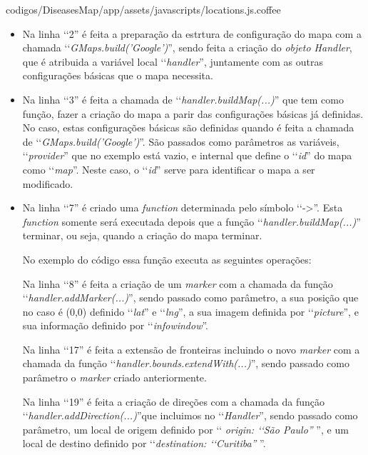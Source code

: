 
{codigos/DiseasesMap/app/assets/javascripts/locations.js.coffee}

\begin{itemize}

 \item Na linha ‘‘2'' é feita a preparação da estrtura de configuração do mapa com a chamada 
 ‘‘\emph{GMaps.build('Google')}'', sendo feita a criação do \emph{objeto Handler}, que é atribuida a 
 variável local ‘‘\emph{handler}'', juntamente com as outras configurações básicas que o mapa necessita.
 
 \item Na linha ‘‘3'' é feita a chamada de ‘‘\emph{handler.buildMap(...)}'' que tem como função, fazer a 
 criação do mapa a parir das configurações básicas já definidas. No caso, estas configurações básicas
 são definidas quando é feita a chamada de ‘‘\emph{GMaps.build('Google')}''. São passados como parâmetros
 as variáveis, ‘‘\emph{provider}'' que no exemplo está vazio, e internal que define o ‘‘\emph{id}'' do
 mapa como ‘‘\emph{map}''. Neste caso, o ‘‘\emph{id}'' serve para identificar o mapa a ser modificado.
 
 \item Na linha ‘‘7'' é criado uma \emph{function} determinada pelo símbolo ‘‘->''. Esta \emph{function}
 somente será executada depois que a função ‘‘\emph{handler.buildMap(...)}'' terminar, ou seja, quando a
 criação do mapa terminar.
 
 No exemplo do código essa função executa as seguintes operações:
 
  \subitem Na linha ‘‘8'' é feita a criação de um \emph{marker} com a chamada da função 
  ‘‘\emph{handler.addMarker(...)}'', sendo passado como parâmetro, a sua posição que no caso é (0,0) 
  definido ‘‘\emph{lat}'' e ‘‘\emph{lng}'', a sua imagem definida por ‘‘\emph{picture}'', e sua informação 
  definido por ‘‘\emph{infowindow}''.
 
  \subitem Na linha ‘‘17'' é feita a extensão de fronteiras incluindo o novo \emph{marker} com a chamada 
  da função ‘‘\emph{handler.bounds.extendWith(...)}'', sendo passado como parâmetro o \emph{marker} criado
  anteriormente.
 
  \subitem Na linha ‘‘19'' é feita a criação de direções com a chamada da função 
  ‘‘\emph{handler.addDirection(...)}''que incluimos no ‘‘\emph{Handler}'', sendo passado como parâmetro, um 
  local de origem definido por ‘‘\emph{ origin: ‘‘São Paulo''} '', e um local de destino definido por 
  ‘‘\emph{destination: ‘‘Curitiba''} ''.
 
\end{itemize}

